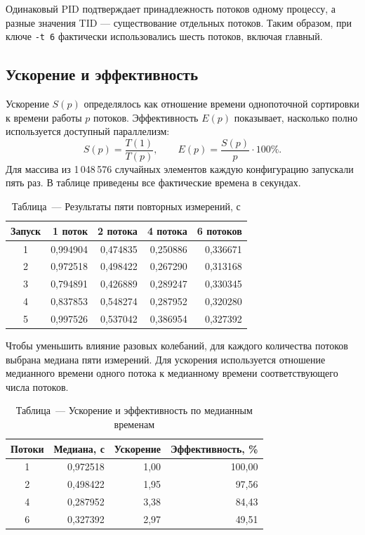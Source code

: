\documentclass[12pt,a4paper]{article}
\begin{document}
Одинаковый PID подтверждает принадлежность потоков одному процессу, а разные значения TID --- существование отдельных потоков. Таким образом, при ключе \texttt{-t 6} фактически использовались шесть потоков, включая главный.

\subsection{Ускорение и эффективность}
Ускорение $S(p)$ определялось как отношение времени однопоточной сортировки к времени работы $p$ потоков. Эффективность $E(p)$ показывает, насколько полно используется доступный параллелизм:
\[
S(p)=\frac{T(1)}{T(p)},\qquad E(p)=\frac{S(p)}{p}\cdot100\%.
\]
Для массива из 1\,048\,576 случайных элементов каждую конфигурацию запускали пять раз. В таблице приведены все фактические времена в секундах.

\begin{table}[H]
\centering\small
\renewcommand{\arraystretch}{1.22}
\begin{tabular}{c r r r r}
\toprule
\textbf{Запуск} & \textbf{1 поток} & \textbf{2 потока} & \textbf{4 потока} & \textbf{6 потоков} \\
\midrule
1 & 0,994904 & 0,474835 & 0,250886 & 0,336671 \\
2 & 0,972518 & 0,498422 & 0,267290 & 0,313168 \\
3 & 0,794891 & 0,426889 & 0,289247 & 0,330345 \\
4 & 0,837853 & 0,548274 & 0,287952 & 0,320280 \\
5 & 0,997526 & 0,537042 & 0,386954 & 0,327392 \\
\bottomrule
\end{tabular}
\caption*{Таблица~--- Результаты пяти повторных измерений, с}
\end{table}

Чтобы уменьшить влияние разовых колебаний, для каждого количества потоков выбрана медиана пяти измерений. Для ускорения используется отношение медианного времени одного потока к медианному времени соответствующего числа потоков.

\begin{table}[H]
\centering\small
\renewcommand{\arraystretch}{1.22}
\begin{tabular}{c r r r}
\toprule
\textbf{Потоки} & \textbf{Медиана, с} & \textbf{Ускорение} & \textbf{Эффективность, \%} \\
\midrule
1 & 0,972518 & 1,00 & 100,00 \\
2 & 0,498422 & 1,95 & 97,56 \\
4 & 0,287952 & 3,38 & 84,43 \\
6 & 0,327392 & 2,97 & 49,51 \\
\bottomrule
\end{tabular}
\caption*{Таблица~--- Ускорение и эффективность по медианным временам}
\end{table}
\end{document}
